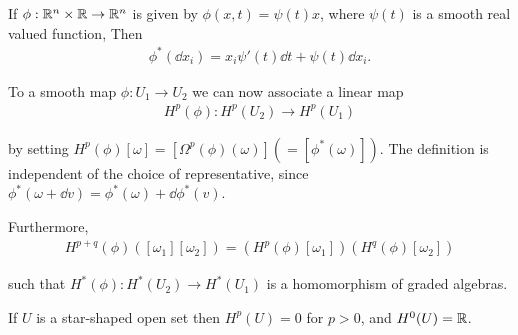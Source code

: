 \begin{example}\label{example:3-14}
If $\phi:{\mathbb{R}}^n\times{\ensuremath{\mathbb{R}}}\to{\ensuremath{\mathbb{R}}}^n$ is given by $\phi(x, t) = \psi(t)x$, where $\psi(t)$ is a smooth real 
valued function, Then 
\begin{align*}
  \phi^*(\!\dd x_i) = x_i \psi'(t)\dd t + \psi(t) \dd x_i.
\end{align*}

To a smooth map $\phi:U_1\to U_2$ we can now associate a linear map
\begin{align*}
  H^p(\phi): H^p(U_2) \to H^p(U_1)
\end{align*}

by setting $H^p(\phi)[\omega] = [\Omega^p(\phi)(\omega)] (=[\phi^*(\omega)])$. The definition is independent of the
choice of representative, since $\phi^*(\omega+\dd v) = \phi^*(\omega) + \dd\phi^*(v)$. 

Furthermore,
\begin{align*}
  H^{p+q}(\phi)([\omega_1][\omega_2]) = (H^p(\phi)[\omega_1])(H^q(\phi)[\omega_2]) 
\end{align*}

such that $H^*(\phi):H^*(U_2)\to H^*(U_1)$ is a homomorphism of graded algebras.
\end{example}

\begin{theorem}\label{theorem:3-15}
If $U$ is a star-shaped open set then $H^p(U) = 0$ for $p > 0$, and $H^0(U) = {\mathbb{R}}$.
\end{theorem}

